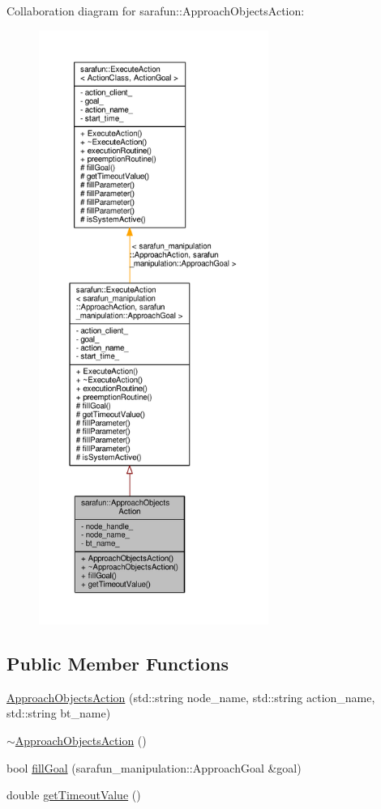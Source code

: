 Collaboration diagram for sarafun\-:\-:Approach\-Objects\-Action\-:\nopagebreak
\begin{figure}[H]
\begin{center}
\leavevmode
\includegraphics[height=550pt]{d7/d78/classsarafun_1_1ApproachObjectsAction__coll__graph}
\end{center}
\end{figure}
\subsection*{Public Member Functions}
\begin{DoxyCompactItemize}
\item 
\hyperlink{classsarafun_1_1ApproachObjectsAction_ab0d857c262d75eeb85d8dc0e8f746f5f_ab0d857c262d75eeb85d8dc0e8f746f5f}{Approach\-Objects\-Action} (std\-::string node\-\_\-name, std\-::string action\-\_\-name, std\-::string bt\-\_\-name)
\item 
\hyperlink{classsarafun_1_1ApproachObjectsAction_adb6adaf7dae2e4addf53f47f07afd21e_adb6adaf7dae2e4addf53f47f07afd21e}{$\sim$\-Approach\-Objects\-Action} ()
\item 
bool \hyperlink{classsarafun_1_1ApproachObjectsAction_af5d216551122da780bc550daf4f1dca4_af5d216551122da780bc550daf4f1dca4}{fill\-Goal} (sarafun\-\_\-manipulation\-::\-Approach\-Goal \&goal)
\item 
double \hyperlink{classsarafun_1_1ApproachObjectsAction_a6852994a6e8a1edf9b2c24c91fd07df2_a6852994a6e8a1edf9b2c24c91fd07df2}{get\-Timeout\-Value} ()
\end{DoxyCompactItemize}
